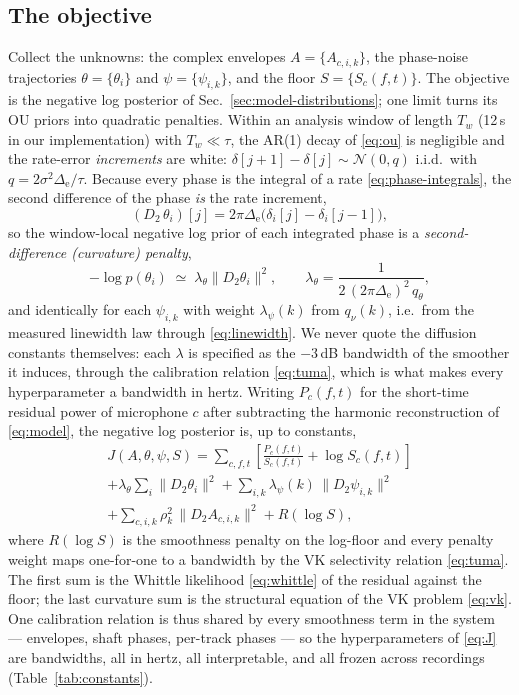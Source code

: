\documentclass[journal]{IEEEtran}
\newcommand{\Jobj}{\ensuremath{J}}
\begin{document}
\subsection{The objective}
\label{sec:map-objective}

Collect the unknowns: the complex envelopes $A = \{A_{c,i,k}\}$, the
phase-noise trajectories $\theta = \{\theta_i\}$ and
$\psi = \{\psi_{i,k}\}$, and the floor $S = \{S_c(f,t)\}$. The
objective is the negative log posterior of
Sec.~\ref{sec:model-distributions}; one limit turns its OU priors into
quadratic penalties. Within an analysis window of length
$T_w$ (12\,s in our implementation) with
$T_w \ll \tau$, the AR(1) decay of \eqref{eq:ou} is negligible and the
rate-error \emph{increments} are white:
$\delta[j{+}1] - \delta[j] \sim \mathcal{N}(0, q)$ i.i.d.\ with
$q = 2\sigma^2 \Delta_{\mathrm{e}}/\tau$. Because every phase is the
integral of a rate \eqref{eq:phase-integrals}, the second difference of
the phase \emph{is} the rate increment,
\begin{equation}
  (D_2\, \theta_i)[j]
  = 2\pi\Delta_{\mathrm{e}} \big( \delta_i[j] - \delta_i[j{-}1] \big),
  \label{eq:d2-increment}
\end{equation}
so the window-local negative log prior of each integrated phase is a
\emph{second-difference (curvature) penalty},
\begin{equation}
  -\log p(\theta_i) \;\simeq\;
  \lambda_\theta \lVert D_2 \theta_i \rVert^2 ,
  \qquad
  \lambda_\theta = \frac{1}{2\, (2\pi \Delta_{\mathrm{e}})^2\,
    q_\theta},
  \label{eq:prior-limit}
\end{equation}
and identically for each $\psi_{i,k}$ with weight $\lambda_\psi(k)$
from $q_{\nu}(k)$, i.e.\ from the measured linewidth law through
\eqref{eq:linewidth}. We never quote the diffusion constants
themselves: each $\lambda$ is specified as the $-3$\,dB bandwidth of
the smoother it induces, through the calibration relation
\eqref{eq:tuma}, which is what makes every hyperparameter a bandwidth
in hertz. Writing $P_{c}(f,t)$ for the short-time residual power of
microphone $c$ after subtracting the harmonic reconstruction of
\eqref{eq:model}, the negative log posterior is, up to constants,
\begin{multline}
  \Jobj(A, \theta, \psi, S) =
  \sum_{c,f,t} \left[ \frac{P_c(f,t)}{S_c(f,t)} + \log S_c(f,t) \right]
  \\
  + \lambda_\theta \sum_i \| D_2 \theta_i \|^2
  + \sum_{i,k} \lambda_\psi(k)\, \| D_2 \psi_{i,k} \|^2
  \\
  + \sum_{c,i,k} \rho_k^2\, \| D_2 A_{c,i,k} \|^2
  + R(\log S),
  \label{eq:J}
\end{multline}
where $R(\log S)$ is the smoothness penalty on the log-floor and every
penalty weight maps one-for-one to a bandwidth by the VK selectivity
relation \eqref{eq:tuma}. The first sum is the Whittle likelihood
\eqref{eq:whittle} of the residual against the floor; the last
curvature sum is the structural equation of the VK problem
\eqref{eq:vk}. One calibration relation is thus shared by every
smoothness term in the system --- envelopes, shaft phases, per-track
phases --- so the hyperparameters of \eqref{eq:J} are bandwidths, all
in hertz, all interpretable, and all frozen across recordings
(Table~\ref{tab:constants}).
\end{document}
